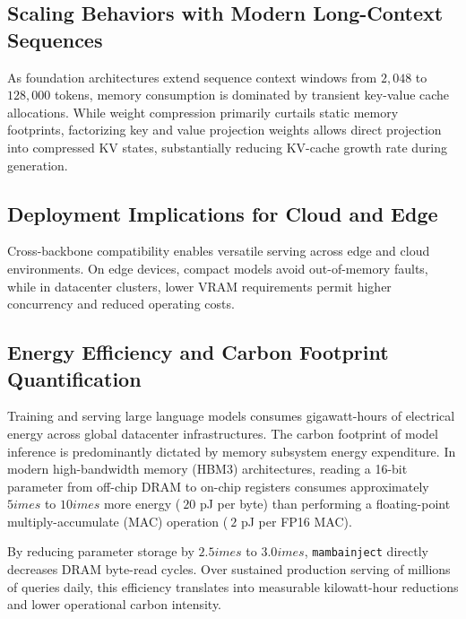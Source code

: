 \subsection{Scaling Behaviors with Modern Long-Context Sequences}
As foundation architectures extend sequence context windows from $2{,}048$ to $128{,}000$ tokens, memory consumption is dominated by transient key-value cache allocations. While weight compression primarily curtails static memory footprints, factorizing key and value projection weights allows direct projection into compressed KV states, substantially reducing KV-cache growth rate during generation.

\subsection{Deployment Implications for Cloud and Edge}
Cross-backbone compatibility enables versatile serving across edge and cloud environments. On edge devices, compact models avoid out-of-memory faults, while in datacenter clusters, lower VRAM requirements permit higher concurrency and reduced operating costs.

\subsection{Energy Efficiency and Carbon Footprint Quantification}
Training and serving large language models consumes gigawatt-hours of electrical energy across global datacenter infrastructures. The carbon footprint of model inference is predominantly dictated by memory subsystem energy expenditure. In modern high-bandwidth memory (HBM3) architectures, reading a 16-bit parameter from off-chip DRAM to on-chip registers consumes approximately $5	imes$ to $10	imes$ more energy ($~20$ pJ per byte) than performing a floating-point multiply-accumulate (MAC) operation ($~2$ pJ per FP16 MAC).

By reducing parameter storage by $2.5	imes$ to $3.0	imes$, \texttt{mambainject} directly decreases DRAM byte-read cycles. Over sustained production serving of millions of queries daily, this efficiency translates into measurable kilowatt-hour reductions and lower operational carbon intensity.
